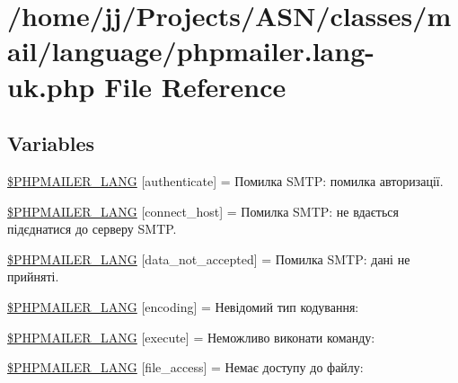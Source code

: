 \hypertarget{phpmailer_8lang-uk_8php}{}\section{/home/jj/\+Projects/\+A\+S\+N/classes/mail/language/phpmailer.lang-\/uk.php File Reference}
\label{phpmailer_8lang-uk_8php}
\subsection*{Variables}
\begin{DoxyCompactItemize}
\item 
\hyperlink{phpmailer_8lang-uk_8php_a2cb33073c989b85580748e331ed8b4aa}{\$\+P\+H\+P\+M\+A\+I\+L\+E\+R\+\_\+\+L\+A\+NG} \mbox{[}\textquotesingle{}authenticate\textquotesingle{}\mbox{]} = \textquotesingle{}Помилка S\+M\+T\+P\+: помилка авторизації.\textquotesingle{}
\item 
\hyperlink{phpmailer_8lang-uk_8php_a2ee0cc637a06b96e45600db31c6799ee}{\$\+P\+H\+P\+M\+A\+I\+L\+E\+R\+\_\+\+L\+A\+NG} \mbox{[}\textquotesingle{}connect\+\_\+host\textquotesingle{}\mbox{]} = \textquotesingle{}Помилка S\+M\+T\+P\+: не вдається підєднатися до серверу S\+M\+T\+P.\textquotesingle{}
\item 
\hyperlink{phpmailer_8lang-uk_8php_a814c6b191205d2361b3233e9c9d6fda5}{\$\+P\+H\+P\+M\+A\+I\+L\+E\+R\+\_\+\+L\+A\+NG} \mbox{[}\textquotesingle{}data\+\_\+not\+\_\+accepted\textquotesingle{}\mbox{]} = \textquotesingle{}Помилка S\+M\+T\+P\+: дані не прийняті.\textquotesingle{}
\item 
\hyperlink{phpmailer_8lang-uk_8php_a817f7283f3d54c970a0c10305cc668cc}{\$\+P\+H\+P\+M\+A\+I\+L\+E\+R\+\_\+\+L\+A\+NG} \mbox{[}\textquotesingle{}encoding\textquotesingle{}\mbox{]} = \textquotesingle{}Невідомий тип кодування\+: \textquotesingle{}
\item 
\hyperlink{phpmailer_8lang-uk_8php_a668217a9563a168f30f2a8548b6ed5a9}{\$\+P\+H\+P\+M\+A\+I\+L\+E\+R\+\_\+\+L\+A\+NG} \mbox{[}\textquotesingle{}execute\textquotesingle{}\mbox{]} = \textquotesingle{}Неможливо виконати команду\+: \textquotesingle{}
\item 
\hyperlink{phpmailer_8lang-uk_8php_a7e83349023b856ef9e5c46e30ae6d51e}{\$\+P\+H\+P\+M\+A\+I\+L\+E\+R\+\_\+\+L\+A\+NG} \mbox{[}\textquotesingle{}file\+\_\+access\textquotesingle{}\mbox{]} = \textquotesingle{}Немає доступу до файлу\+: \textquotesingle{}

\end{DoxyCompactItemize}
